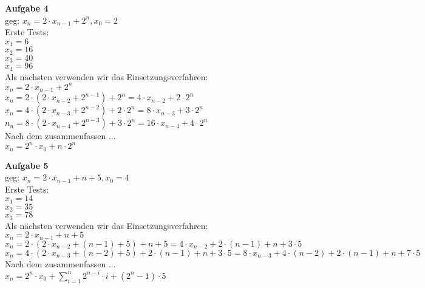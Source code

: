 \documentclass[a4paper]{scrartcl}
\begin{document}
	\begin{flushleft}
		\textbf{Aufgabe 4}\\
		geg: $x_n=2\cdot x_{n-1}+2^n, x_0=2$\\
		Erste Tests:\\
		$x_1=6$\\		
		$x_2=16$\\
		$x_3=40$\\
		$x_4=96$\\
		Als nächsten verwenden wir das Einsetzungsverfahren:\\
		$x_n=2\cdot x_{n-1}+2^n$\\
		$x_n=2\cdot (2\cdot x_{n-2}+2^{n-1})+2^n=4\cdot x_{n-2}+2\cdot 2^n$\\
		$x_n=4\cdot (2\cdot x_{n-3}+2^{n-2})+2\cdot 2^n=8\cdot x_{n-3}+3\cdot 2^n$\\
		$n_n=8\cdot (2\cdot x_{n-4}+2^{n-3})+3\cdot 2^n=16\cdot x_{n-4}+4\cdot 2^n$\\
		Nach dem zusammenfassen ...\\
		$x_n=2^n\cdot x_0+n\cdot 2^n$\\
	\end{flushleft}
	\begin{flushleft}
		\textbf{Aufgabe 5}\\
		geg: $x_n=2\cdot x_{n-1}+n+5, x_0=4$\\
		Erste Tests:\\
		$x_1=14$\\
		$x_2=35$\\
		$x_3=78$\\
		Als nächsten verwenden wir das Einsetzungsverfahren:\\
		$x_n=2\cdot x_{n-1}+n+5$\\
		$x_n=2\cdot(2\cdot x_{n-2}+(n-1)+5)+n+5=4\cdot x_{n-2}+2\cdot(n-1)+n+3\cdot 5$\\
		$x_n=4\cdot(2\cdot x_{n-3}+(n-2)+5)+2\cdot(n-1)+n+3\cdot 5=8\cdot x_{n-3}+4\cdot(n-2)+2\cdot(n-1)+n+7\cdot 5$\\
		Nach dem zusammenfassen ...\\
		$x_n=2^n\cdot x_0+\sum\limits_{i=1}^{n}2^{n-i}\cdot i+(2^n-1)\cdot 5$
	\end{flushleft}
\end{document}

